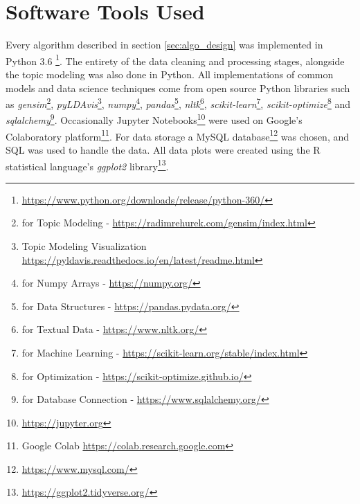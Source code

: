 \section{Software Tools Used} \label{sec:tools}
    Every algorithm described in section \ref{sec:algo_design} was implemented in Python 3.6 \footnote{\url{https://www.python.org/downloads/release/python-360/}}. The entirety of the data cleaning and processing stages, alongside the topic modeling was also done in Python. All implementations of common models and data science techniques come from open source Python libraries such as \emph{gensim}\footnote{for Topic Modeling - \url{https://radimrehurek.com/gensim/index.html}}, \emph{pyLDAvis}\footnote{Topic Modeling Visualization \url{https://pyldavis.readthedocs.io/en/latest/readme.html}}, \emph{numpy}\footnote{for Numpy Arrays - \url{https://numpy.org/}}, \emph{pandas}\footnote{for Data Structures - \url{https://pandas.pydata.org/}}, \emph{nltk}\footnote{for Textual Data - \url{https://www.nltk.org/}}, \emph{scikit-learn}\footnote{for Machine Learning - \url{https://scikit-learn.org/stable/index.html}}, \emph{scikit-optimize}\footnote{for Optimization - \url{https://scikit-optimize.github.io/}} and \emph{sqlalchemy}\footnote{for Database Connection - \url{https://www.sqlalchemy.org/}}. Occasionally Jupyter Notebooks\footnote{\url{https://jupyter.org}} were used on Google's Colaboratory \cite{bisong2019google} platform\footnote{Google Colab \url{https://colab.research.google.com}}. For data storage a MySQL database\footnote{\url{https://www.mysql.com/}} was chosen, and SQL was used to handle the data. All data plots were created using the R \cite{team2013r} statistical language's \emph{ggplot2} \cite{wickham2016ggplot2} library\footnote{\url{https://ggplot2.tidyverse.org/}}.


    
